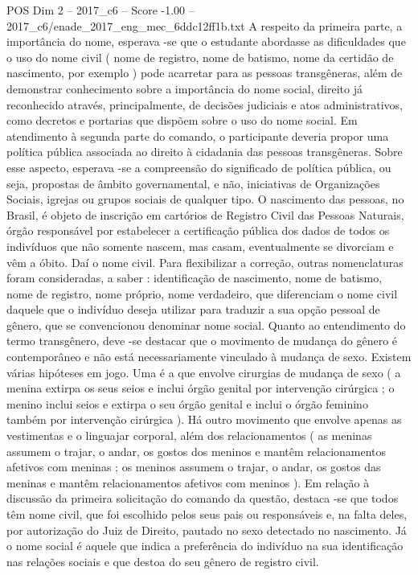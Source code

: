 \begin{textsample}{POS Dim 2 – 2017\_c6 – Score -1.00 – 2017\_c6/enade\_2017\_eng\_mec\_6ddc12ff1b.txt}
A respeito da primeira parte, a importância do nome, esperava -se que o estudante abordasse as dificuldades que o uso do nome civil ( nome de registro, nome de batismo, nome da certidão de nascimento, por exemplo ) pode acarretar para as pessoas transgêneras, além de demonstrar conhecimento sobre a importância do nome social, direito já reconhecido através, principalmente, de decisões judiciais e atos administrativos, como decretos e portarias que dispõem sobre o uso do nome social.
Em atendimento à segunda parte do comando, o participante deveria propor uma política pública associada ao direito à cidadania das pessoas transgêneras.
Sobre esse aspecto, esperava -se a compreensão do significado de política pública, ou seja, propostas de âmbito governamental, e não, iniciativas de Organizações Sociais, igrejas ou grupos sociais de qualquer tipo.
O nascimento das pessoas, no Brasil, é objeto de inscrição em cartórios de Registro Civil das Pessoas Naturais, órgão responsável por estabelecer a certificação pública dos dados de todos os indivíduos que não somente nascem, mas casam, eventualmente se divorciam e vêm a óbito.
Daí o nome civil.
Para flexibilizar a correção, outras nomenclaturas foram consideradas, a saber : identificação de nascimento, nome de batismo, nome de registro, nome próprio, nome verdadeiro, que diferenciam o nome civil daquele que o indivíduo deseja utilizar para traduzir a sua opção pessoal de gênero, que se convencionou denominar nome social.
Quanto ao entendimento do termo transgênero, deve -se destacar que o movimento de mudança do gênero é contemporâneo e não está necessariamente vinculado à mudança de sexo.
Existem várias hipóteses em jogo.
Uma é a que envolve cirurgias de mudança de sexo ( a menina extirpa os seus seios e inclui órgão genital por intervenção cirúrgica ; o menino inclui seios e extirpa o seu órgão genital e inclui o órgão feminino também por intervenção cirúrgica ).
Há outro movimento que envolve apenas as vestimentas e o linguajar corporal, além dos relacionamentos ( as meninas assumem o trajar, o andar, os gostos dos meninos e mantêm relacionamentos afetivos com meninas ; os meninos assumem o trajar, o andar, os gostos das meninas e mantêm relacionamentos afetivos com meninos ).
Em relação à discussão da primeira solicitação do comando da questão, destaca -se que todos têm nome civil, que foi escolhido pelos seus pais ou responsáveis e, na falta deles, por autorização do Juiz de Direito, pautado no sexo detectado no nascimento.
Já o nome social é aquele que indica a preferência do indivíduo na sua identificação nas relações sociais e que destoa do seu gênero de registro civil.

\end{textsample}
